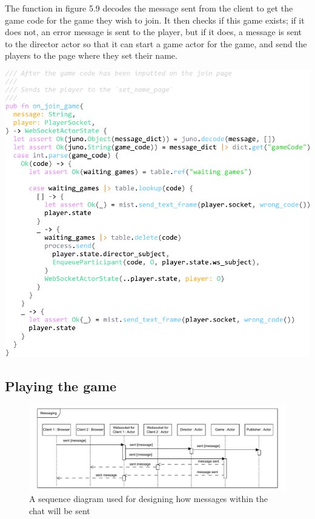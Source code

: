 \documentclass[]{final}
\begin{document}
\begin{minipage}[t]{18em}
  The function in figure 5.9 decodes the message sent from the client to
  get the game code for the game they wish to join. It then checks if this game
  exists; if it does not, an error message is sent to the player, but if it does,
  a message is sent to the director actor so that it can start a game actor for the game,
  and send the players to the page where they set their name.
\end{minipage}
\hfill
\begin{minipage}[t]{20em}
  \includegraphics[width=\textwidth]{on_join_game.pdf}
  \label{fig: 9}
\end{minipage}

\newpage
{}
\subsection{Playing the game}

\begin{figure}[ht!]
  \centering
  \includegraphics[width=0.9\linewidth]{sequence_messaging}
  \caption{A sequence diagram used for designing how messages within the chat will be sent}
  \label{fig: 10}
\end{figure}
\end{document}
